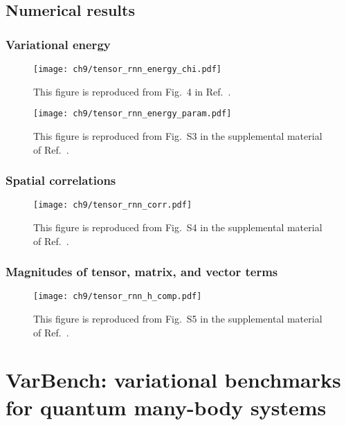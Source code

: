 \section{Numerical results}

\subsection{Variational energy}

\begin{figure}[htb]
\centering
\hspace*{-0.05\linewidth}
\texttt{[image: ch9/tensor\_rnn\_energy\_chi.pdf]}
\caption[Variational energy vs. bond dimension for tensor-RNN]{
This figure is reproduced from Fig.~4 in Ref.~\cite{wu2023tensor}.
}
\label{fig:tensor-rnn-energy-chi}
\end{figure}

\begin{figure}[htb]
\centering
\hspace*{-0.05\linewidth}
\texttt{[image: ch9/tensor\_rnn\_energy\_param.pdf]}
\caption[Variational energy vs. number of parameters for tensor-RNN]{
This figure is reproduced from Fig.~S3 in the supplemental material of Ref.~\cite{wu2023tensor}.
}
\label{fig:tensor-rnn-energy-param}
\end{figure}

\subsection{Spatial correlations}
\label{sec:tensor-rnn-corr}

\begin{figure}[htb]
\centering
\hspace*{-0.05\linewidth}
\texttt{[image: ch9/tensor\_rnn\_corr.pdf]}
\caption[Spin correlations in MPS-RNN]{
This figure is reproduced from Fig.~S4 in the supplemental material of Ref.~\cite{wu2023tensor}.
}
\label{fig:tensor-rnn-corr}
\end{figure}

\subsection{Magnitudes of tensor, matrix, and vector terms}
\label{sec:tensor-rnn-magnitude}

\begin{figure}[htb]
\centering
\texttt{[image: ch9/tensor\_rnn\_h\_comp.pdf]}
\caption[Magnitudes of tensor, matrix, and vector terms in tensor-RNN]{
This figure is reproduced from Fig.~S5 in the supplemental material of Ref.~\cite{wu2023tensor}.
}
\label{fig:tensor-rnn-h-comp}
\end{figure}

\chapter{VarBench: variational benchmarks for quantum many-body systems}
\label{ch:varbench}
